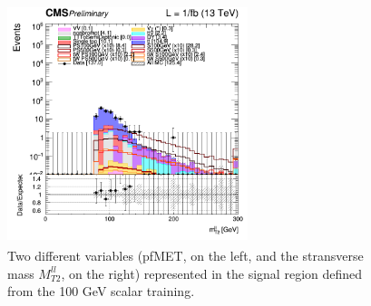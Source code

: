 \documentclass[a4paper, 10pt, openright]{report}
\begin{document}
\begin{figure}[htbp]
{\begin{minipage}[b]{.48\textwidth}
\end{minipage}\hfill
\begin{minipage}[b]{.48\textwidth}
\includegraphics[width=7cm, height=7cm]{figs/log_cratio_topCR_ll_DNN_signal0_scalar100_mt2ll_2017.png}
\end{minipage} \hfill
}
\caption{Two different variables (pf\ac{MET}, on the left, and the stransverse mass $M_{T2}^{ll}$, on the right) represented in the signal region defined from the 100 GeV scalar training.}
\label{fig:SR1}
\end{figure}
\end{document}

